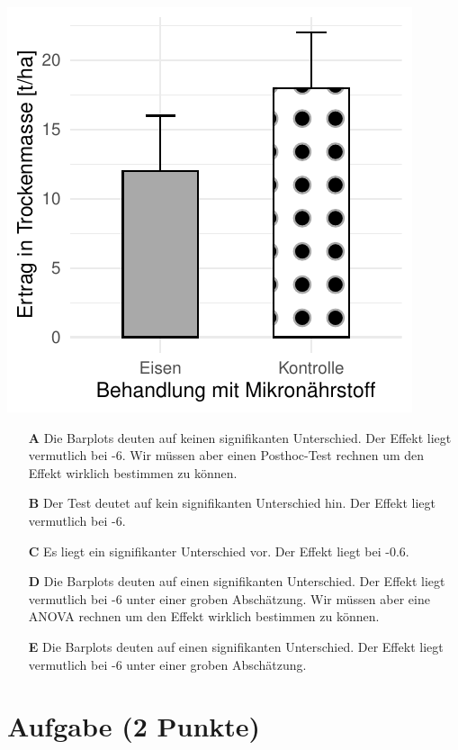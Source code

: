 \documentclass[a4paper, 9pt]{scrartcl}\usepackage[]{graphicx}\usepackage[]{xcolor}
\makeatletter
\def\maxwidth{ %
  \ifdim\Gin@nat@width>\linewidth
    \linewidth
  \else
    \Gin@nat@width
  \fi
}
\makeatother
\begin{document}
{\centering \includegraphics[width=\maxwidth]{img/mc-testing-ttest-02-1} 

}







\begin{enumerate}
\item [\textbf{A} \msquare] Die Barplots deuten auf keinen signifikanten Unterschied. Der Effekt liegt vermutlich bei -6. Wir müssen aber einen Posthoc-Test rechnen um den Effekt wirklich bestimmen zu können.
\item [\textbf{B} \msquare] Der Test deutet auf kein signifikanten Unterschied hin. Der Effekt liegt vermutlich bei -6.
\item [\textbf{C} \msquare] Es liegt ein signifikanter Unterschied vor. Der Effekt liegt bei -0.6.
\item [\textbf{D} \msquare] Die Barplots deuten auf einen signifikanten Unterschied. Der Effekt liegt vermutlich bei -6 unter einer groben Abschätzung. Wir müssen aber eine ANOVA rechnen um den Effekt wirklich bestimmen zu können.
\item [\textbf{E} \msquare] Die Barplots deuten auf einen signifikanten Unterschied. Der Effekt liegt vermutlich bei -6 unter einer groben Abschätzung.
\end{enumerate}

\section{Aufgabe \hfill (2 Punkte)}
\end{document}
